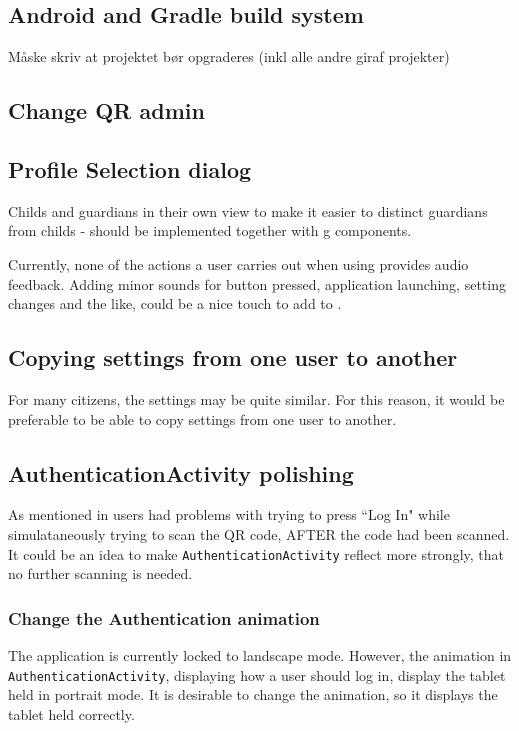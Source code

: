 \subsection{Android and Gradle build system}
Måske skriv at projektet bør opgraderes (inkl alle andre giraf projekter)

\subsection{Change QR admin}

\subsection{Profile Selection dialog}
Childs and guardians in their own view to make it easier to distinct guardians from childs - should be implemented together with g components.

Currently, none of the actions a user carries out when using \launcher provides audio feedback.
Adding minor sounds for button pressed, application launching, setting changes and the like, could be a nice touch to add to \launcher. 

\subsection{Copying settings from one user to another}
For many citizens, the settings may be quite similar.
For this reason, it would be preferable to be able to copy settings from one user to another.        

\subsection{AuthenticationActivity polishing}
As mentioned in  users had problems with trying to press ``Log In" while simulataneously trying to scan the QR code, AFTER the code had been scanned.
It could be an idea to make \lstinline!AuthenticationActivity! reflect more strongly, that no further scanning is needed.

\subsubsection{Change the Authentication animation}
The application is currently locked to landscape mode.
However, the animation in \lstinline!AuthenticationActivity!, displaying how a user should log in, display the tablet held in portrait mode.
It is desirable to change the animation, so it displays the tablet held correctly.

